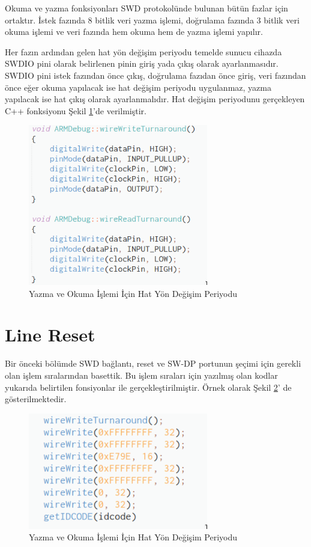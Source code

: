 Okuma ve yazma fonksiyonları SWD protokolünde bulunan bütün fazlar için ortaktır. İstek fazında 8 bitlik veri yazma işlemi, doğrulama fazında 3 bitlik veri okuma işlemi ve veri fazında hem okuma hem de yazma işlemi yapılır.

Her fazın ardından gelen hat yön değişim periyodu temelde sunucu cihazda SWDIO pini olarak belirlenen pinin giriş yada çıkış olarak ayarlanmasıdır. SWDIO pini istek fazından önce çıkış, doğrulama fazıdan önce giriş, veri fazından önce eğer okuma yapılacak ise hat değişim periyodu uygulanmaz, yazma yapılacak ise hat çıkış olarak ayarlanmalıdır. Hat değişim periyodunu gerçekleyen C++ fonksiyonu Şekil \ref{fig:turnaround}'de verilmiştir.


\begin{figure}[h]
\centering
\includegraphics[width=0.7\textwidth]{gorseller/turnaround}
\caption{Yazma ve Okuma İşlemi İçin Hat Yön Değişim Periyodu}\label{fig:turnaround}
\end{figure}


\section{Line Reset}

Bir önceki bölümde SWD bağlantı, reset ve SW-DP portunun şeçimi için gerekli olan işlem sıralarından basettik. Bu işlem sıraları için yazılmış olan kodlar yukarıda belirtilen fonsiyonlar ile gerçekleştirilmiştir. Örnek olarak Şekil \ref{fig:lineReset}' de gösterilmektedir.
\clearpage

\begin{figure}[h]
\centering
\includegraphics[width=0.7\textwidth]{gorseller/lineReset}
\caption{Yazma ve Okuma İşlemi İçin Hat Yön Değişim Periyodu}\label{fig:lineReset}
\end{figure}

